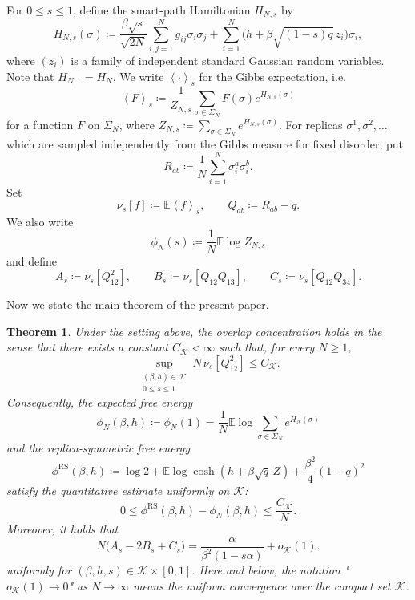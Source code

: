 \documentclass[11pt]{article}
\newtheorem{theorem}{Theorem}[section]
\numberwithin{equation}{section}
\newcommand{\E}{\mathbb{E}}
\newcommand{\1}{\mathbf 1}
\newcommand{\cK}{\mathcal K}
\newcommand{\braket}[1]{\left\langle #1\right\rangle}
\begin{document}
For $0\le s\le 1$, define the smart-path Hamiltonian $H_{N,s}$ by 
\begin{equation}
 H_{N,s}(\sigma)
 \coloneqq
 \frac{\beta\sqrt s}{\sqrt{2N}}
 \sum_{i,j=1}^Ng_{ij}\sigma_i\sigma_j
 +\sum_{i=1}^N
 \bigl(h+\beta\sqrt{(1-s)q}\,z_i\bigr)\sigma_i,
 \label{eq:path}
\end{equation}
where $(z_i)$ is a family of independent standard Gaussian random variables. Note that $H_{N,1}=H_N.$
We write $\braket{\cdot}_s$ for the Gibbs expectation, i.e. 
\[
\braket{F}_s \coloneqq \frac{1}{Z_{N, s}}\sum _{\sigma \in \Sigma _N} F(\sigma ) e^{H_{N, s}(\sigma)}
\]
for a function $F$ on $\Sigma _N$, where $Z_{N,s} \coloneqq \sum _{\sigma \in \Sigma _N} e^{H_{N,s}(\sigma )}$.
For replicas $\sigma^1,\sigma^2,\ldots$ which are sampled independently from the Gibbs measure for fixed disorder, put
\[
 R_{ab}\coloneqq\frac1N\sum_{i=1}^N\sigma_i^a\sigma_i^b.
\]
Set
\[
 \nu_s[f]\coloneqq\E\braket{f}_s,\qquad
 Q_{ab}\coloneqq R_{ab}-q.
\]
We also write
\begin{equation}
 \phi_N(s)\coloneqq\frac1N\E\log Z_{N,s}
 \label{eq:pathfreeenergy}
\end{equation}
and define
\begin{equation}
 A_s\coloneqq\nu_s[Q_{12}^2],\qquad
 B_s\coloneqq\nu_s[Q_{12}Q_{13}],\qquad
 C_s\coloneqq\nu_s[Q_{12}Q_{34}].
 \label{eq:ABC}
\end{equation}

Now we state the main theorem of the present paper.

\begin{theorem}
\label{thm:main}
Under the setting above, the overlap concentration holds in the sense that there exists a constant $C_{\cK}<\infty$ such that, for every $N\ge1$,
\begin{equation}\label{eq:main1}
 \sup_{\substack{(\beta,h)\in\cK\\0\le s\le1}}
 N\,\nu_s[Q_{12}^2]\le C_{\cK}.
\end{equation}
Consequently, the expected free energy 
\[
 \phi_N(\beta,h)\coloneqq \phi_N(1) = 
 \frac1N\E\log\sum_{\sigma\in\Sigma_N}e^{H_N(\sigma)}
\]
and the replica-symmetric free energy
\[
 \phi^{\mathrm{RS}}(\beta,h)
 \coloneqq
 \log2+\E\log\cosh(h+\beta\sqrt q\,Z)
 +\frac{\beta^2}{4}(1-q)^2
\]
satisfy the quantitative estimate uniformly on $\cK$:
\begin{equation}\label{eq:main2}
 0\le\phi^{\mathrm{RS}}(\beta,h)-\phi_N(\beta,h)
 \le\frac{C_{\cK}}N.
\end{equation}
Moreover, it holds that
\begin{equation}\label{eq:main3}
 N\bigl(A_s-2B_s+C_s\bigr)
 =
 \frac{\alpha}{\beta^2(1-s\alpha)}+o_{\cK}(1).
\end{equation}
uniformly for $(\beta,h,s)\in\cK\times[0,1]$.
Here and below, the notation "$o_{\cK}(1)\to0$" as $N\to\infty$ means the uniform convergence over the compact set $\mathcal K$.
\end{theorem}
\end{document}

